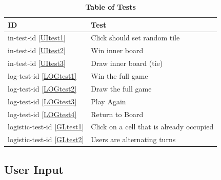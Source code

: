 \documentclass[12pt, titlepage]{article}
\newcommand{\UIref}[1]{in-test-id \ref{#1}}
\newcommand{\LOGref}[1]{log-test-id \ref{#1}}
\newcommand{\GLref}[1]{logistic-test-id \ref{#1}}
\begin{document}
\begin{table}[H]
\caption{\textbf{Table of Tests}} \label{TbTestList}
\begin{tabularx}{\textwidth}{p{3cm}X}
\toprule
\textbf{ID} & \textbf{Test} \\
\midrule

\UIref{UItest1} & Click should set random tile \\
\UIref{UItest2} & Win inner board \\
\UIref{UItest3} & Draw inner board (tie) \\
\LOGref{LOGtest1} & Win the full game\\
\LOGref{LOGtest2} & Draw the full game\\
\LOGref{LOGtest3} & Play Again\\
\LOGref{LOGtest4}  & Return to Board\\
\GLref{GLtest1} & Click on a cell that is already occupied \\
\GLref{GLtest2} & Users are alternating turns\\

\bottomrule
\end{tabularx}
\end{table}

\subsection{User Input}
\end{document}
